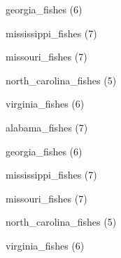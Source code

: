 \documentclass[11pt]{article}
\begin{document}
\begin{multicols}{2}
\vspace{1\baselineskip}

georgia\_fishes (6)

\vspace{1\baselineskip}

mississippi\_fishes (7)

\vspace{1\baselineskip}

missouri\_fishes (7)

\vspace{1\baselineskip}

north\_carolina\_fishes (5)

\vspace{1\baselineskip}



virginia\_fishes (6)

\vspace{1\baselineskip}

alabama\_fishes (7)

\vspace{1\baselineskip}

georgia\_fishes (6)

\vspace{1\baselineskip}

mississippi\_fishes (7)

\vspace{1\baselineskip}

missouri\_fishes (7)

\vspace{1\baselineskip}

north\_carolina\_fishes (5)

\vspace{1\baselineskip}



virginia\_fishes (6)

\end{multicols}
\end{document}
